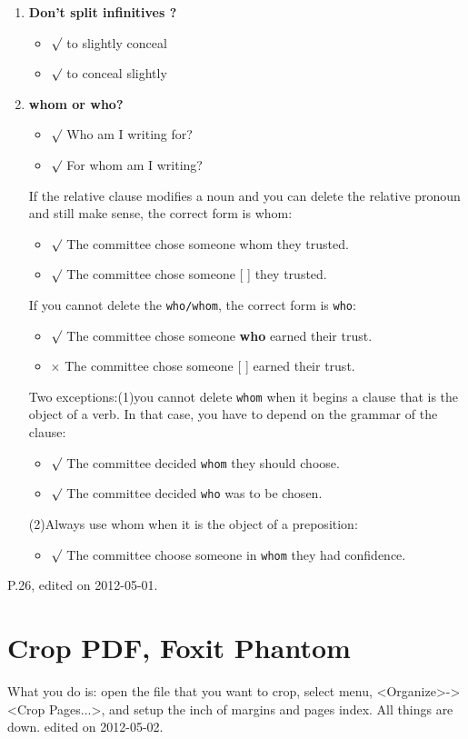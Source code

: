 \begin{enumerate}
\item {\bf Don't split infinitives ?} 
\begin{itemize}
\item[] $\surd$ to slightly conceal
\item[] $\surd$ to conceal slightly
\end{itemize}
\item{\bf whom or who?}
\begin{itemize}
\item []$\surd$ Who am I writing for?
\item []$\surd$ For whom am I writing?
\end{itemize}
If the relative clause modifies a noun and you can delete the relative pronoun and still make sense, the correct form is whom:
\begin{itemize}
\item []$\surd$ The committee chose someone whom they trusted.
\item []$\surd$ The committee chose someone [ ] they trusted.
\end{itemize}
If you cannot delete the \texttt{who/whom}, the correct form is \texttt{who}:
\begin{itemize}
\item []$\surd$ The committee chose someone {\bf who} earned their trust. 
\item []$\times$ The committee chose someone [ ] earned their trust.
\end{itemize}
Two exceptions:(1)you cannot delete \texttt{whom} when it begins a clause that is the object of a verb. In that case, you have to depend on the grammar of the clause:
\begin{itemize}
\item[]$\surd$ The committee decided \texttt{whom} they should choose.
\item[]$\surd$ The committee decided \texttt{who} was to be chosen.
\end{itemize}
(2)Always use whom when it is the object of a preposition:
\begin{itemize}
\item[]$\surd$ The committee choose someone in \texttt{whom} they had confidence. 
\end{itemize}

\end{enumerate}
\hfill {\tiny P.26, edited on 2012-05-01.}

\section{Crop PDF, Foxit Phantom}
What you do is: open the file that you want to crop, select menu, <Organize>-><Crop Pages...>, and setup the inch of margins and pages index. All things are down.
\hfill {\tiny  edited on 2012-05-02.}

